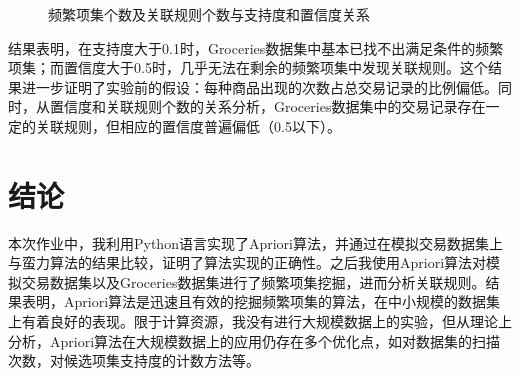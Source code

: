 \documentclass[12pt,a4paper]{article}
\theoremstyle{definition}
\begin{document}
\begin{figure}[H]
	\centering
	\caption{频繁项集个数及关联规则个数与支持度和置信度关系}
	\label{fig:apriori}
\end{figure}

结果表明，在支持度大于0.1时，Groceries数据集中基本已找不出满足条件的频繁项集；而置信度大于0.5时，几乎无法在剩余的频繁项集中发现关联规则。这个结果进一步证明了实验前的假设：每种商品出现的次数占总交易记录的比例偏低。同时，从置信度和关联规则个数的关系分析，Groceries数据集中的交易记录存在一定的关联规则，但相应的置信度普遍偏低（0.5以下）。

\section{结论}

本次作业中，我利用Python语言实现了Apriori算法，并通过在模拟交易数据集上与蛮力算法的结果比较，证明了算法实现的正确性。之后我使用Apriori算法对模拟交易数据集以及Groceries数据集进行了频繁项集挖掘，进而分析关联规则。结果表明，Apriori算法是迅速且有效的挖掘频繁项集的算法，在中小规模的数据集上有着良好的表现。限于计算资源，我没有进行大规模数据上的实验，但从理论上分析，Apriori算法在大规模数据上的应用仍存在多个优化点，如对数据集的扫描次数，对候选项集支持度的计数方法等。
\end{document}
